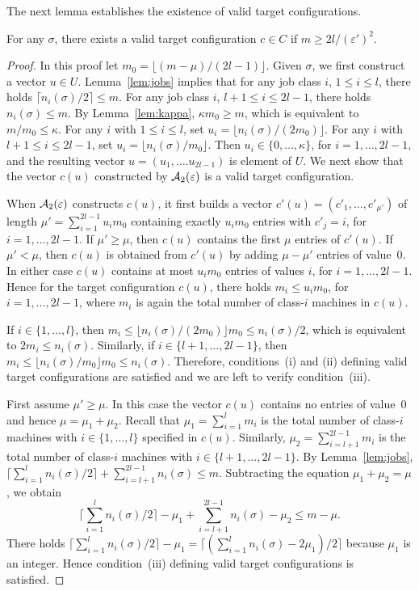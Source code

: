 \documentclass{llncs}
\newcommand{\eps}{\varepsilon}
\begin{document}
The next lemma establishes the existence of valid target configurations.
\begin{lemma}\label{lem:config}
For any $\sigma$, there exists a valid target configuration $c\in C$ if $m \geq 2l/(\eps')^2$.  
\end{lemma}
\begin{proof}
In this proof let $m_0 = \lfloor (m-\mu)/(2l-1)\rfloor$. Given $\sigma$, we first construct a vector 
$u\in U$. Lemma~\ref{lem:jobs} implies that for any job class $i$, $1\leq i \leq l$, there holds
$\lceil n_i(\sigma)/2\rceil \leq m$. For any job class $i$, $l+1\leq i \leq 2l-1$, there holds $n_i(\sigma) \leq m$.
By Lemma~\ref{lem:kappa}, $\kappa m_0\geq m$, which is equivalent to $m/m_0 \leq \kappa$. For any $i$
with $1\leq i \leq l$, set $u_i = \lfloor n_i(\sigma)/(2m_0)\rfloor$. For any $i$ with 
$l+1\leq i \leq 2l-1$, set $u_i = \lfloor n_i(\sigma)/m_0\rfloor$. Then $u_i \in \{0,\ldots, \kappa\}$, for
$i=1,\ldots, 2l-1$, and the resulting vector $u=(u_1, \ldots. u_{2l-1})$ is element of $U$. We next show
that the vector $c(u)$ constructed by ${\cal A}_2(\eps)$ is a valid target configuration.

When ${\cal A}_2(\eps)$ constructs $c(u)$, it first builds a vector $c'(u)= (c'_1,\ldots, c'_{\mu'})$ of
length $\mu' = \sum_{i=1}^{2l-1} u_im_0$ containing exactly $u_im_0$ entries with $c'_j = i$, for
$i=1,\ldots, 2l-1$. If $\mu'\geq \mu$, then $c(u)$ contains the first $\mu$ entries of $c'(u)$. If 
$\mu'<\mu$, then $c(u)$ is obtained from $c'(u)$ by adding $\mu-\mu'$ entries of value~0. In either case 
$c(u)$ contains at most $u_im_0$ entries of values $i$, for $i=1,\ldots, 2l-1$. Hence for the target
configuration $c(u)$, there holds $m_i\leq u_im_0$, for $i=1,\ldots, 2l-1$, where $m_i$ is again the total
number of class-$i$ machines in $c(u)$. 

If $i\in\{1,\ldots, l\}$, then $m_i \leq \lfloor n_i(\sigma)/(2m_0)\rfloor m_0 \leq n_i(\sigma)/2$,
which is equivalent to $2m_i \leq n_i(\sigma)$. Similarly, if $i\in \{l+1, \ldots, 2l-1\}$, then 
$m_i \leq \lfloor n_i(\sigma)/m_0\rfloor m_0 \leq n_i(\sigma)$. Therefore, conditions~(i) and (ii) 
defining valid target configurations are satisfied and we are left to verify
condition~(iii).

First assume $\mu'\geq \mu$. In this case the vector $c(u)$ contains no entries of value~0 and hence 
$\mu = \mu_1+\mu_2$. Recall that $\mu_1 = \sum_{i=1}^l m_i$ is the total number of class-$i$ machines 
with $i\in \{1,\ldots, l\}$ specified in $c(u)$. Similarly, $\mu_2 = \sum_{i=l+1}^{2l-1} m_i$ is
the total number of class-$i$ machines with $i\in \{l+1,\ldots, 2l-1\}$. By Lemma~\ref{lem:jobs}, 
$\lceil \sum_{i=1}^l n_i(\sigma) / 2 \rceil + \sum_{i=l+1}^{2l-1} n_i(\sigma) \leq m$. Subtracting
the equation $\mu_1+\mu_2 = \mu$, we obtain 
$$\textstyle \lceil \sum_{i=1}^l n_i(\sigma) / 2 \rceil -\mu_1 + \sum_{i=l+1}^{2l-1} n_i(\sigma) -\mu_2 
\leq m-\mu.$$
There holds $\lceil \sum_{i=1}^l n_i(\sigma) / 2 \rceil -\mu_1 = \lceil (\sum_{i=1}^l n_i(\sigma) -2\mu_1)/ 2 \rceil$
because $\mu_1$ is an integer. Hence condition~(iii) defining valid target configurations is 
satisfied.


\end{proof}
\end{document}
